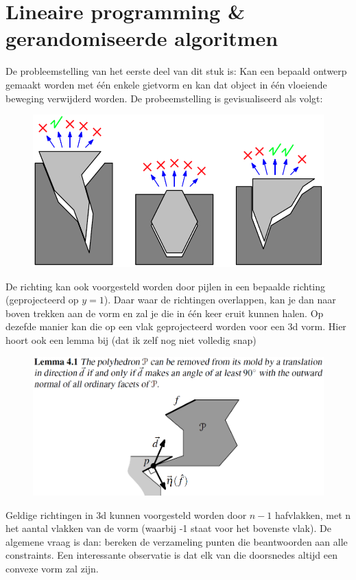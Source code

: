 \documentclass[12pt,a4paper]{article}
\begin{document}
	
	\section{Lineaire programming \& gerandomiseerde algoritmen}
	De probleemstelling van het eerste deel van dit stuk is: Kan een bepaald ontwerp gemaakt worden met één enkele gietvorm en kan dat object in één vloeiende beweging verwijderd worden. De probeemstelling is gevisualiseerd als volgt: 
	\begin{figure}[H]
		\centering
		\includegraphics[width=0.6\linewidth]{afbeeldingen/gietvorm-voorbeeld}
		\label{fig:gietvorm-voorbeeld}
	\end{figure}
	
	De richting kan ook voorgesteld worden door pijlen in een bepaalde richting (geprojecteerd op $y=1$). Daar waar de richtingen overlappen, kan je dan naar boven trekken aan de vorm en zal je die in één keer eruit kunnen halen. Op dezefde manier kan die op een vlak geprojecteerd worden voor een 3d vorm. Hier hoort ook een lemma bij (dat ik zelf nog niet volledig snap)
	\begin{figure}[H]
		\centering
		\includegraphics[width=0.7\linewidth]{afbeeldingen/gietvorm-lemm}
		\label{fig:gietvorm-lemma}
	\end{figure}
	
	Geldige richtingen in 3d kunnen voorgesteld worden door $n-1$ hafvlakken, met n het aantal vlakken van de vorm (waarbij -1 staat voor het bovenste vlak). De algemene vraag is dan: bereken de verzameling punten die beantwoorden aan alle constraints. Een interessante observatie is dat elk van die doorsnedes altijd een convexe vorm zal zijn. 
	
\end{document}
